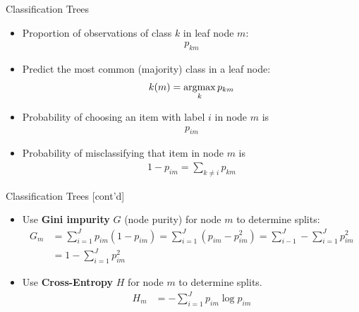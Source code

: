 \documentclass[ignorenonframetext,xcolor=x11names]{beamer}
\begin{document}
\begin{frame}[label=full]{Classification Trees}
\begin{itemize}

   \item Proportion of observations of class $k$ in leaf node $m$:
   \begin{align*}p_{km}\end{align*}
   \item Predict the most common (majority) class in a leaf node: 
   \begin{align*}k(m) = \operatorname*{argmax}_k p_{km}\end{align*}
   \item Probability of choosing an item with label $i$ in node $m$ is
   \begin{align*}p_{im}\end{align*}
   \item Probability of misclassifying that item in node $m$ is 
   \begin{align*}1 - p_{im} = \sum_{k \neq i} p_{km}\end{align*}
   
\end{itemize}
\end{frame}

\begin{frame}[label=advanced]{Classification Trees \small [cont'd]}
\begin{itemize}
   \item Use \textbf{Gini impurity} $G$ (node purity) for node $m$ to determine splits:
   \begin{align*}
   G_m &= \sum_{i=1}^J p_{im}(1-p_{im}) = \sum_{i=1}^J (p_{im} - p_{im}^2) = \sum_{i-1}^J - \sum_{i=1}^J p_{im}^2 \\
     &= 1 - \sum_{i=1}^J p_{im}^2
   \end{align*} 
   
   \item Use \textbf{Cross-Entropy} $H$ for node $m$ to determine splits.
   \begin{align*}
   H_m &= - \sum_{i=1}^J p_{im} \log p_{im} 
   \end{align*}
   
\end{itemize}
\end{frame}
\end{document}
